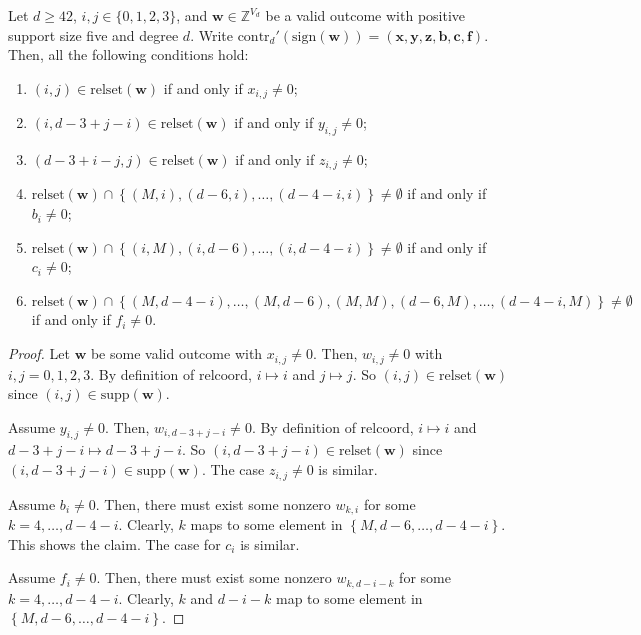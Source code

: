 \begin{proposition}\label{prop:iewjri3j3234212121112}
    Let \( d \geq 42 \), \( i,j \in \{ 0,1,2,3 \} \), and \( \mathbf{w} \in \mathbb{Z}^{V_d} \) be a valid outcome with positive support size five and degree \( d \). Write \( \mathrm{contr}_d'(\mathrm{sign}(\mathbf{w})) = (\mathbf{x},\mathbf{y},\mathbf{z},\mathbf{b},\mathbf{c},\mathbf{f} ) \). Then, all the following conditions hold:
    \begin{enumerate}
        \item \( (i,j) \in \mathrm{relset}(\mathbf{w}) \) if and only if \( x_{i,j} \neq 0 \);
        \item \( (i, d-3+j-i) \in \mathrm{relset}(\mathbf{w}) \) if and only if \( y_{i,j} \neq 0 \);
        \item \( (d-3+i-j,j) \in \mathrm{relset}(\mathbf{w}) \) if and only if \( z_{i,j} \neq 0 \);
        \item \( \mathrm{relset}(\mathbf{w}) \cap \left\{ (M,i), (d-6, i), \dots, (d-4-i, i) \right\} \neq \emptyset \) if and only if \( b_i \neq 0 \);
        \item \( \mathrm{relset}(\mathbf{w}) \cap \left\{ (i,M), (i, d-6), \dots, (i,d-4-i) \right\} \neq \emptyset \) if and only if \( c_i \neq 0 \);
        \item \( \mathrm{relset}(\mathbf{w}) \cap \left\{ (M, d-4-i), \dots, (M, d-6), (M,M), (d-6, M), \dots, (d-4-i, M) \right\} \neq \emptyset \) if and only if \( f_i \neq 0 \).
    \end{enumerate}
\end{proposition}

\begin{proof}
    Let \( \mathbf{w} \) be some valid outcome with \( x_{i,j} \neq 0 \). Then, \( w_{i,j} \neq 0 \) with \( i,j = 0, 1,2, 3 \). By definition of \( \mathrm{relcoord} \), \( i \mapsto i \) and \( j \mapsto j \). So \( (i,j) \in \mathrm{relset}(\mathbf{w}) \) since \( (i,j) \in \mathrm{supp}(\mathbf{w}) \).

    Assume \( y_{i,j} \neq 0 \). Then, \( w_{i, d-3+j-i} \neq 0 \). By definition of \( \mathrm{relcoord} \), \( i \mapsto i \) and \( d-3+j-i \mapsto d-3+j-i \). So \( (i,d-3+j-i) \in \mathrm{relset}(\mathbf{w}) \) since \( (i,d-3+j-i) \in \mathrm{supp}(\mathbf{w}) \). The case \( z_{i,j} \neq 0 \) is similar.

    Assume \( b_{i} \neq 0 \). Then, there must exist some nonzero \( w_{k, i} \) for some \( k = 4, \dots, d-4-i \). Clearly, \( k \) maps to some element in \( \left\{ M, d-6, \dots, d-4-i \right\} \). This shows the claim. The case for \( c_i \) is similar.

    Assume \( f_{i} \neq 0 \). Then, there must exist some nonzero \( w_{k, d-i-k} \) for some \( k = 4, \dots, d-4-i \). Clearly, \( k \) and \( d-i-k \)  map to some element in \( \left\{ M, d-6, \dots, d-4-i \right\} \).
\end{proof}

